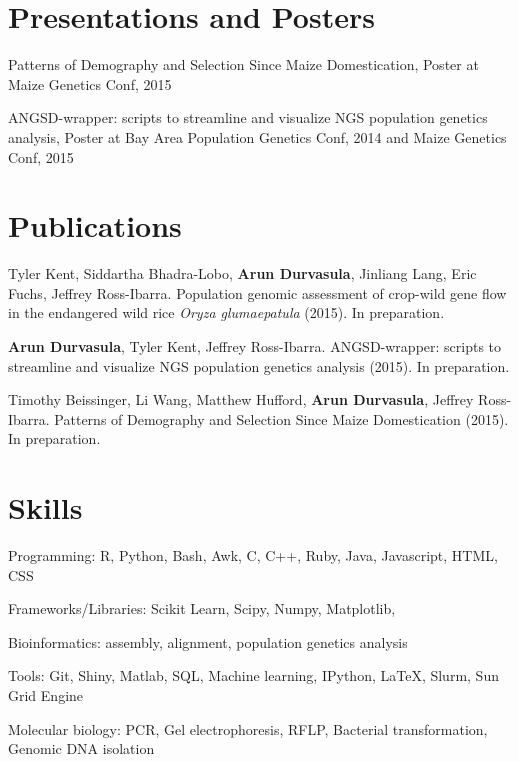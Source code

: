 \documentclass[letterpaper]{article}
\renewenvironment{itemize}{
  \begin{list}{}{
    \setlength{\leftmargin}{1.5em}
  }
}{
  \end{list}
}
\begin{document}
\section*{Presentations and Posters}
\begin{itemize}
\item Patterns of Demography and Selection Since Maize Domestication, Poster at Maize Genetics Conf, 2015
\item ANGSD-wrapper: scripts to streamline and visualize NGS population genetics analysis, Poster at Bay Area Population Genetics Conf, 2014 and Maize Genetics Conf, 2015
\end{itemize}

\section*{Publications}
\begin{itemize}
\item Tyler Kent, Siddartha Bhadra-Lobo, {\bf Arun Durvasula}, Jinliang Lang, Eric Fuchs, Jeffrey Ross-Ibarra. Population genomic assessment of crop-wild gene flow in the endangered wild rice \emph{Oryza glumaepatula} (2015). In preparation.
\item {\bf Arun Durvasula}, Tyler Kent, Jeffrey Ross-Ibarra. ANGSD-wrapper: scripts to streamline and visualize NGS population genetics analysis (2015). In preparation. %
\item Timothy Beissinger, Li Wang, Matthew Hufford, {\bf Arun Durvasula}, Jeffrey Ross-Ibarra. Patterns of Demography and Selection Since Maize Domestication (2015). In preparation.
\end{itemize}

\section*{Skills}
\begin{itemize}
\item Programming: R, Python, Bash, Awk, C, C++, Ruby, Java, Javascript, HTML, CSS
\item Frameworks/Libraries: Scikit Learn, Scipy, Numpy, Matplotlib, 
\item Bioinformatics: assembly, alignment, population genetics analysis
\item Tools: Git, Shiny, Matlab, SQL, Machine learning, IPython, LaTeX, Slurm, Sun Grid Engine
\item Molecular biology: PCR, Gel electrophoresis, RFLP, Bacterial transformation, Genomic DNA isolation
\end{itemize}
\end{document}
